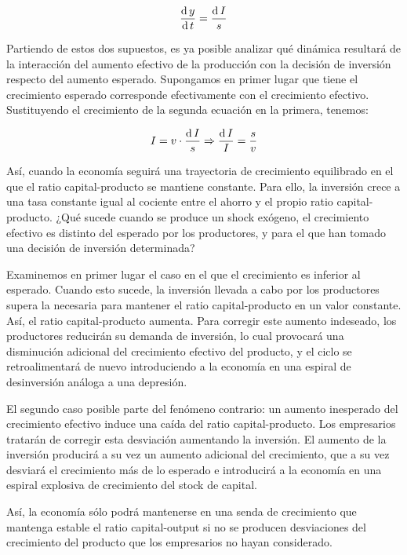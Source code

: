 \documentclass{nuevotema}
\begin{document}
\begin{equation}
\dfrac{\text{d} \, y}{\text{d} \, t} = \frac{\text{d} \, I}{s}
\end{equation}

Partiendo de estos dos supuestos, es ya posible analizar qué dinámica resultará de la interacción del aumento efectivo de la producción con la decisión de inversión respecto del aumento esperado. Supongamos en primer lugar que tiene el crecimiento esperado corresponde efectivamente con el crecimiento efectivo. Sustituyendo el crecimiento de la segunda ecuación en la primera, tenemos:

\begin{equation}
I = v \cdot \frac{\text{d} \, I}{s} \Rightarrow \frac{\text{d} \, I}{I} = \frac{s}{v}
\end{equation}

Así, cuando la economía seguirá una trayectoria de crecimiento equilibrado en el que el ratio capital-producto se mantiene constante. Para ello, la inversión crece a una tasa constante igual al cociente entre el ahorro y el propio ratio capital-producto. ¿Qué sucede cuando se produce un shock exógeno, el crecimiento efectivo es distinto del esperado por los productores, y para el que han tomado una decisión de inversión determinada? 

Examinemos en primer lugar el caso en el que el crecimiento es inferior al esperado. Cuando esto sucede, la inversión llevada a cabo por los productores supera la necesaria para mantener el ratio capital-producto en un valor constante. Así, el ratio capital-producto aumenta. Para corregir este aumento indeseado, los productores reducirán su demanda de inversión, lo cual provocará una disminución adicional del crecimiento efectivo del producto, y el ciclo se retroalimentará de nuevo introduciendo a la economía en una espiral de desinversión análoga a una depresión. 

El segundo caso posible parte del fenómeno contrario: un aumento inesperado del crecimiento efectivo induce una caída del ratio capital-producto. Los empresarios tratarán de corregir esta desviación aumentando la inversión. El aumento de la inversión producirá a su vez un aumento adicional del crecimiento, que a su vez desviará el crecimiento más de lo esperado e introducirá a la economía en una espiral explosiva de crecimiento del stock de capital.

Así, la economía sólo podrá mantenerse en una senda de crecimiento que mantenga estable el ratio capital-output si no se producen desviaciones del crecimiento del producto que los empresarios no hayan considerado. 
\end{document}
